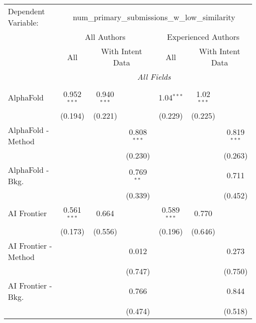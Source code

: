 \begingroup
\centering
\begin{tabular}{lcccccc}
   \tabularnewline \midrule \midrule
   Dependent Variable: & \multicolumn{6}{c}{num\_primary\_submissions\_w\_low\_similarity}\\
 & \multicolumn{3}{c}{All Authors} & \multicolumn{3}{c}{Experienced Authors} \\
\cmidrule(lr){2-4} \cmidrule(lr){5-7}
 & \multicolumn{1}{c}{All} & \multicolumn{2}{c}{With Intent Data} & \multicolumn{1}{c}{All} & \multicolumn{2}{c}{With Intent Data} \\
\cmidrule(lr){2-2} \cmidrule(lr){3-4} \cmidrule(lr){5-5} \cmidrule(lr){6-7}
 & \multicolumn{6}{c}{\textit{All Fields}} \\ \\
   AlphaFold            & 0.952$^{***}$ & 0.940$^{***}$ &               & 1.04$^{***}$  & 1.02$^{***}$ &   \\   
                        & (0.194)       & (0.221)       &               & (0.229)       & (0.225)      &   \\   
   AlphaFold - Method   &               &               & 0.808$^{***}$ &               &              & 0.819$^{***}$\\   
                        &               &               & (0.230)       &               &              & (0.263)\\   
   AlphaFold - Bkg.     &               &               & 0.769$^{**}$  &               &              & 0.711\\   
                        &               &               & (0.339)       &               &              & (0.452)\\   
   AI Frontier          & 0.561$^{***}$ & 0.664         &               & 0.589$^{***}$ & 0.770        &   \\   
                        & (0.173)       & (0.556)       &               & (0.196)       & (0.646)      &   \\   
   AI Frontier - Method &               &               & 0.012         &               &              & 0.273\\   
                        &               &               & (0.747)       &               &              & (0.750)\\   
   AI Frontier - Bkg.   &               &               & 0.766         &               &              & 0.844\\   
                        &               &               & (0.474)       &               &              & (0.518)\\   

\end{tabular}
